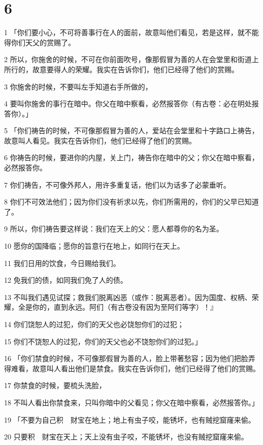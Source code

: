 \chapter{6}

\par 1 「你们要小心，不可将善事行在人的面前，故意叫他们看见，若是这样，就不能得你们天父的赏赐了。
\par 2 所以，你施舍的时候，不可在你前面吹号，像那假冒为善的人在会堂里和街道上所行的，故意要得人的荣耀。我实在告诉你们，他们已经得了他们的赏赐。
\par 3 你施舍的时候，不要叫左手知道右手所做的，
\par 4 要叫你施舍的事行在暗中。你父在暗中察看，必然报答你（有古卷：必在明处报答你）。」
\par 5 「你们祷告的时候，不可像那假冒为善的人，爱站在会堂里和十字路口上祷告，故意叫人看见。我实在告诉你们，他们已经得了他们的赏赐。
\par 6 你祷告的时候，要进你的内屋，关上门，祷告你在暗中的父；你父在暗中察看，必然报答你。
\par 7 你们祷告，不可像外邦人，用许多重复话，他们以为话多了必蒙垂听。
\par 8 你们不可效法他们；因为你们没有祈求以先，你们所需用的，你们的父早已知道了。
\par 9 所以，你们祷告要这样说：我们在天上的父：愿人都尊你的名为圣。
\par 10 愿你的国降临；愿你的旨意行在地上，如同行在天上。
\par 11 我们日用的饮食，今日赐给我们。
\par 12 免我们的债，如同我们免了人的债。
\par 13 不叫我们遇见试探；救我们脱离凶恶（或作：脱离恶者）。因为国度、权柄、荣耀，全是你的，直到永远。阿们（有古卷没有因为至阿们等字）！』
\par 14 你们饶恕人的过犯，你们的天父也必饶恕你们的过犯；
\par 15 你们不饶恕人的过犯，你们的天父也必不饶恕你们的过犯。」
\par 16 「你们禁食的时候，不可像那假冒为善的人，脸上带著愁容；因为他们把脸弄得难看，故意叫人看出他们是禁食。我实在告诉你们，他们已经得了他们的赏赐。
\par 17 你禁食的时候，要梳头洗脸，
\par 18 不叫人看出你禁食来，只叫你暗中的父看见；你父在暗中察看，必然报答你。」
\par 19 「不要为自己积　财宝在地上；地上有虫子咬，能锈坏，也有贼挖窟窿来偷。
\par 20 只要积　财宝在天上；天上没有虫子咬，不能锈坏，也没有贼挖窟窿来偷。
